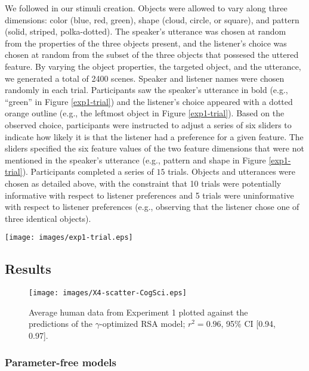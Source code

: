 \documentclass[10pt,a4paper]{article}
\begin{document}
We followed  in our stimuli creation. Objects were allowed to vary along three dimensions: color (blue, red, green), shape (cloud, circle, or square), and pattern (solid, striped, polka-dotted). The speaker's utterance was chosen at random from the properties of the three objects present, and the listener's choice was chosen at random from the subset of the three objects that possesed the uttered feature. By varying the object properties, the targeted object, and the utterance, we generated a total of 2400 scenes. Speaker and listener names were chosen randomly in each trial. Participants saw the speaker's utterance in bold (e.g., ``green'' in Figure \ref{exp1-trial}) and the listener's choice appeared with a dotted orange outline (e.g., the leftmost object in Figure \ref{exp1-trial}). Based on the observed choice, participants were instructed to adjust a series of six sliders to indicate how likely it is that the listener had a preference for a given feature. The sliders specified the six feature values of the two feature dimensions that were not mentioned in the speaker's utterance (e.g., pattern and shape in Figure \ref{exp1-trial}). Participants completed a series of $15$ trials. Objects and utterances were chosen as detailed above, with the constraint that 10 trials were potentially informative with respect to listener preferences and 5 trials were uninformative with respect to listener preferences (e.g., observing that the listener chose one of three identical objects). 

\begin{figure*}[ht!]
	\centering
	\texttt{[image: images/exp1-trial.eps]}
	\caption{A sample trial from \emph{Experiment 1: Inferring preferences}.}\label{exp1-trial}
\end{figure*}

\subsection{Results}

\begin{figure}[ht]
	\centering
	\texttt{[image: images/X4-scatter-CogSci.eps]}
	\caption{Average human data from Experiment 1 plotted against the predictions of the $\gamma$-optimized RSA model; $r^{2}=0.96$, 95\% CI [0.94, 0.97].}\label{exp1-results}
\end{figure}

\subsubsection{Parameter-free models}
\end{document}
